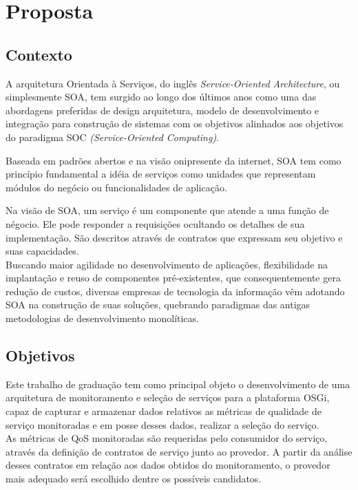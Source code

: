 \chapter{Proposta}
\section{Contexto}
\label{pr:contex}

A arquitetura Orientada à Serviços, do inglês \textit{Service-Oriented Architecture}, ou simplesmente SOA, tem surgido ao longo dos últimos anos como uma das abordagens preferidas de design arquitetura, modelo de desenvolvimento e integração para construção de sistemas com os objetivos alinhados aos objetivos do paradigma SOC \textit{(Service-Oriented Computing)}.

Baseada em padrões abertos e na visão onipresente da internet, SOA tem como princípio fundamental a idéia de serviços como unidades que representam módulos do negócio ou funcionalidades de aplicação.

Na visão de SOA, um serviço é um componente que atende a uma função de négocio. Ele pode responder a requisições ocultando os detalhes de sua implementação. São descritos através de contratos que expressam seu objetivo e suas capacidades.
\\

Buscando maior agilidade no desenvolvimento de aplicações, flexibilidade na implantação e reuso de componentes pré-existentes, que consequentemente gera redução de custos, diversas empresas de tecnologia da informação vêm adotando SOA na construção de suas soluções, quebrando paradigmas das antigas metodologias de desenvolvimento monolíticas.



\newpage
\section{Objetivos}
\label{pr:objectives}

Este trabalho de graduação tem como principal objeto o desenvolvimento de uma arquitetura de monitoramento e seleção de serviços para a plataforma OSGi, capaz de capturar e armazenar dados relativos as métricas de qualidade de serviço monitoradas e em posse desses dados, realizar a seleção do serviço.
\\

As métricas de QoS monitoradas são requeridas pelo consumidor do serviço, através da definição de contratos de serviço junto ao provedor. A partir da análise desses contratos em relação aos dados obtidos do monitoramento, o provedor mais adequado será escolhido dentre os possíveis candidatos.

